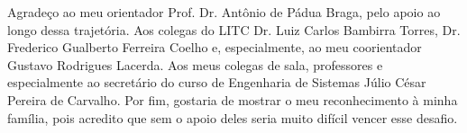 


\begin{agradecimentos}

Agradeço ao meu orientador Prof. Dr. Antônio de Pádua Braga, pelo apoio ao longo dessa trajetória. Aos colegas do LITC Dr. Luiz Carlos Bambirra Torres, Dr. Frederico Gualberto Ferreira Coelho e, especialmente, ao meu coorientador Gustavo Rodrigues Lacerda. 
Aos meus colegas de sala, professores e especialmente ao secretário do curso de Engenharia de Sistemas Júlio César Pereira de Carvalho. 
Por fim, gostaria de mostrar o meu reconhecimento à minha família, pois acredito que sem o apoio deles seria muito difícil vencer esse desafio.

\end{agradecimentos}
